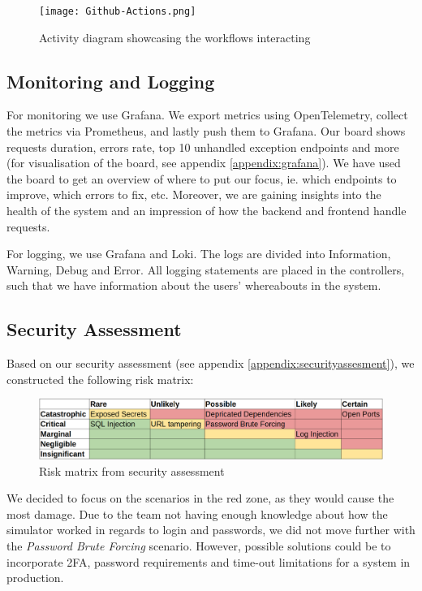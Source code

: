 \begin{figure}[H]
    \centering
    \texttt{[image: Github-Actions.png]}
    \caption{Activity diagram showcasing the workflows interacting }
    \label{fig:workflows}
\end{figure}

\subsection{Monitoring and Logging}
For monitoring we use Grafana. We export metrics using OpenTelemetry, collect the metrics via Prometheus, and lastly push them to Grafana. Our board shows requests duration, errors rate, top 10 unhandled exception endpoints and more (for visualisation of the board, see appendix \ref{appendix:grafana}). We have used the board to get an overview of where to put our focus, ie. which endpoints to improve, which errors to fix, etc. Moreover, we are gaining insights into the health of the system and an impression of how the backend and frontend handle requests.

For logging, we use Grafana and Loki. The logs are divided into Information, Warning, Debug and Error. All logging statements are placed in the controllers, such that we have information about the users' whereabouts in the system.

\subsection{Security Assessment}
Based on our security assessment (see appendix \ref{appendix:securityassesment}), we constructed the following risk matrix:
\begin{figure}[H]
    \centering
    \includegraphics[width=1\linewidth]{images/risk-matrix.png}
    \caption{Risk matrix from security assessment}
    \label{fig:enter-label}
\end{figure}
We decided to focus on the scenarios in the red zone, as they would cause the most damage. Due to the team not having enough knowledge about how the simulator worked in regards to login and passwords, we did not move further with the \textit{Password Brute Forcing} scenario. However, possible solutions could be to incorporate 2FA, password requirements and time-out limitations for a system in production.

